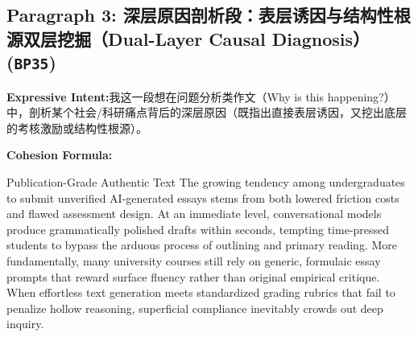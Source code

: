 \subsection*{Paragraph 3: 深层原因剖析段：表层诱因与结构性根源双层挖掘（Dual-Layer Causal Diagnosis） (\texttt{BP35})}
\noindent\textbf{Expressive Intent:}\enspace 我这一段想在问题分析类作文（Why is this happening?）中，剖析某个社会/科研痛点背后的深层原因（既指出直接表层诱因，又挖出底层的考核激励或结构性根源）。\par
\noindent\textbf{Cohesion Formula:}\par\vspace{4pt}
\begin{ExampleBox}{Publication-Grade Authentic Text}
The growing tendency among undergraduates to submit unverified AI-generated essays stems from both lowered friction costs and flawed assessment design. At an immediate level, conversational models produce grammatically polished drafts within seconds, tempting time-pressed students to bypass the arduous process of outlining and primary reading. More fundamentally, many university courses still rely on generic, formulaic essay prompts that reward surface fluency rather than original empirical critique. When effortless text generation meets standardized grading rubrics that fail to penalize hollow reasoning, superficial compliance inevitably crowds out deep inquiry.
\end{ExampleBox}
